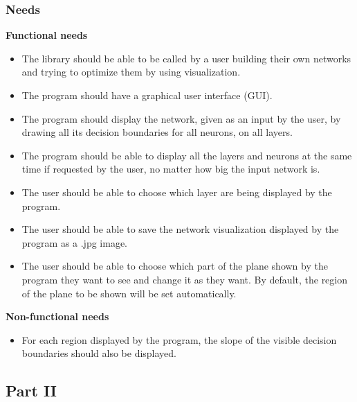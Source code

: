 \documentclass[a4paper]{article}
\begin{document}
\subsubsection{Needs}
\noindent\textbf{Functional needs}
\begin{itemize}
\item The library should be able to be called by a user building their own networks and trying to optimize them by using visualization.
\item The program should have a graphical user interface (GUI).
\item The program should display the network, given as an input by the user, by drawing all its decision boundaries for all neurons, on all layers. 
\item The program should be able to display all the layers and neurons at the same time if requested by the user, no matter how big the input network is.
\item The user should be able to choose which layer are being displayed by the program. 
\item The user should be able to save the network visualization displayed by the program as a .jpg image.
\item The user should be able to choose which part of the plane shown by the program they want to see and change it as they want. By default, the region of the plane to be shown will be set automatically. 

\end{itemize}
\noindent\textbf{Non-functional needs}
\begin{itemize}
\item For each region displayed by the program, the slope of the visible decision boundaries should also be displayed.
\end{itemize}

\subsection{Part II}
\end{document}
